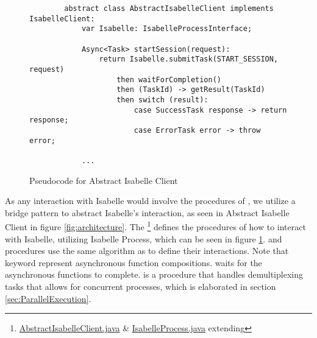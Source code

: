 \begin{figure}[!htb]
    \begin{lstlisting}
        abstract class AbstractIsabelleClient implements IsabelleClient:
            var Isabelle: IsabelleProcessInterface;
        
            Async<Task> startSession(request):
                return Isabelle.submitTask(START_SESSION, request)
                    then waitForCompletion()
                    then (TaskId) -> getResult(TaskId)
                    then switch (result):
                        case SuccessTask response -> return response;
                        case ErrorTask error -> throw error;
            
            ...
    \end{lstlisting}

    \caption{Pseudocode for Abstract Isabelle Client}
    \label{fig:AbstractIsabelleClient}
\end{figure}

As any interaction with Isabelle would involve the procedures of , we utilize a bridge pattern to abstract Isabelle's 
interaction, as seen in Abstract Isabelle Client in figure \ref{fig:architecture}. The \footnote{\href{https://github.com/achmadafriza/veritest-dev/blob/master/src/main/java/com/veriopt/veritest/isabelle/AbstractIsabelleClient.java}{AbstractIsabelleClient.java} \& \href{https://github.com/achmadafriza/veritest-dev/blob/master/src/main/java/com/veriopt/veritest/isabelle/IsabelleProcess.java}{IsabelleProcess.java} extending } 
defines the procedures of how to interact with Isabelle, utilizing Isabelle Process, which can be seen in figure \ref{fig:AbstractIsabelleClient}. 
 and  procedures use the same algorithm as  to define their interactions.
Note that  keyword represent asynchronous function compositions.  waits for the 
asynchronous functions to complete.  is a procedure that handles demultiplexing tasks that allows for concurrent 
processes, which is elaborated in section \ref{sec:ParallelExecution}.

